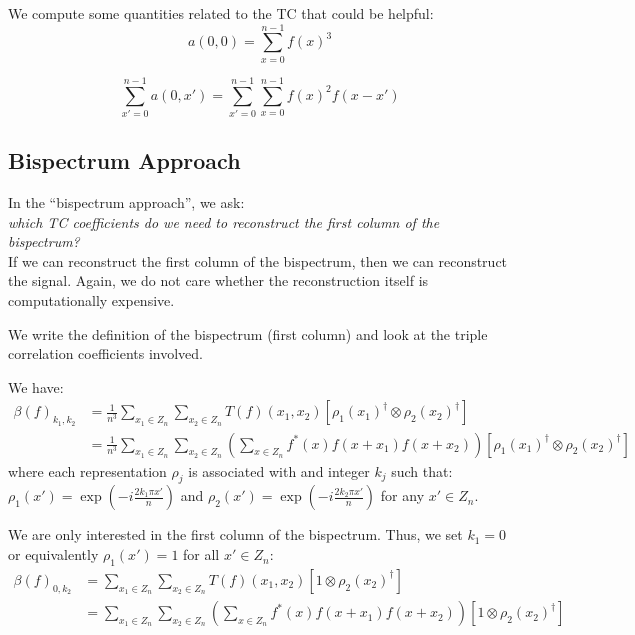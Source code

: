 We compute some quantities related to the TC that could be helpful:
\begin{equation}
    a(0, 0) = \sum_{x = 0}^{n-1} f(x)^3
\end{equation}


\begin{equation}
   \sum_{x'=0}^{n-1} a(0, x') =  \sum_{x'=0}^{n-1} \sum_{x = 0}^{n-1} f(x)^2f(x-x')
\end{equation}


\subsection{Bispectrum Approach}

In the ``bispectrum approach'', we ask:\\

\textit{which TC coefficients do we need to reconstruct the first column of the bispectrum?}\\

If we can reconstruct the first column of the bispectrum, then we can reconstruct the signal. Again, we do not care whether the reconstruction itself is computationally expensive.

We write the definition of the bispectrum (first column) and look at the triple correlation coefficients involved.

We have:
\begin{align*}
    \beta(f)_{k_1, k_2}
        &=
    \frac{1}{n^3}\sum_{x_1 \in Z_n} \sum_{x_2 \in Z_n}
    T(f)(x_1, x_2)\left[
                \rho_1(x_1)^{\dagger} \otimes \rho_2(x_2)^{\dagger}
            \right]\\
    &=
    \frac{1}{n^3}\sum_{x_1 \in Z_n} \sum_{x_2 \in Z_n}
    \left(\sum_{x \in Z_n}
       f^*(x)
       f\left(x + x_1\right) f\left(x+ x_2\right)\right)
            \left[
                \rho_1(x_1)^{\dagger} \otimes \rho_2(x_2)^{\dagger}
            \right]
\end{align*}
where each representation $\rho_j$ is associated with and integer $k_j$ such that: $\rho_1(x') = \exp(-i\frac{2k_1\pi x'}{n})$ and $\rho_2(x') = \exp(-i\frac{2k_2\pi x'}{n})$ for any $x' \in Z_n$.

We are only interested in the first column of the bispectrum. Thus, we set $k_1 = 0$ or equivalently $\rho_1(x') = 1$ for all $x' \in Z_n$:
\begin{align*}
    \beta(f)_{0, k_2}
        &=
    \sum_{x_1 \in Z_n} \sum_{x_2 \in Z_n}
    T(f)(x_1, x_2)\left[
                1 \otimes \rho_2(x_2)^{\dagger}
            \right]\\
    &=
    \sum_{x_1 \in Z_n} \sum_{x_2 \in Z_n}
    \left(\sum_{x \in Z_n}
       f^*(x)
       f\left(x + x_1\right) f\left(x+ x_2\right)\right)
            \left[
                1\otimes \rho_2(x_2)^{\dagger}
            \right]\\
\end{align*}

